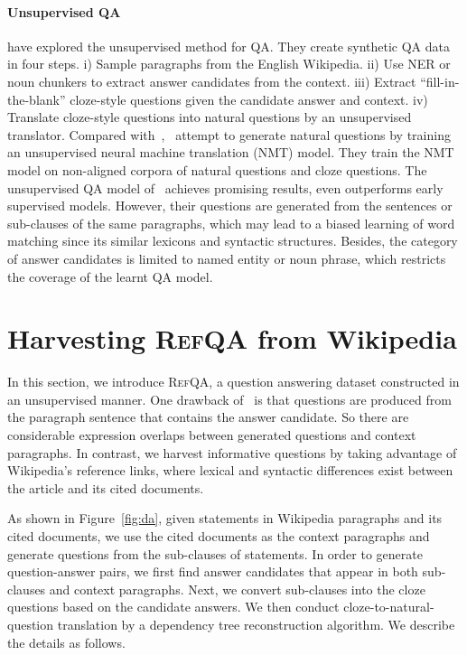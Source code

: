 \documentclass[11pt,a4paper]{article}
\newcommand\refqa{\textsc{RefQA}}
\begin{document}
\paragraph{Unsupervised QA} \citet{lewis2019unsupervisedqa} have explored the unsupervised method for QA. They create synthetic QA data in four steps. i) Sample paragraphs from the English Wikipedia. ii) Use NER or noun chunkers to extract answer candidates from the context. iii) Extract ``fill-in-the-blank'' cloze-style questions given the candidate answer and context. iv) Translate cloze-style questions into natural questions by an unsupervised translator. Compared with~\citet{dhingra2019semi},~\citet{lewis2019unsupervisedqa} attempt to generate natural questions by training an unsupervised neural machine translation (NMT) model. They train the NMT model on non-aligned corpora of natural questions and cloze questions. The unsupervised QA model of~\citet{lewis2019unsupervisedqa} achieves promising results, even outperforms early supervised models.
However, their questions are generated from the sentences or sub-clauses of the same paragraphs, which may lead to a biased learning of word matching since its similar lexicons and syntactic structures. 
Besides, the category of answer candidates is limited to named entity or noun phrase, which restricts the coverage of the learnt QA model. 



\section{Harvesting \refqa{} from Wikipedia}
\label{sec:da}



In this section, we introduce \refqa{}, a question answering dataset constructed in an unsupervised manner.
One drawback of~\citet{lewis2019unsupervisedqa} is that questions are produced from the paragraph sentence that contains the answer candidate. So there are considerable expression overlaps between generated questions and context paragraphs.
In contrast, we harvest informative questions by taking advantage of Wikipedia's reference links, where lexical and syntactic differences exist between the article and its cited documents.



As shown in Figure~\ref{fig:da}, given statements in Wikipedia paragraphs and its cited documents, we use the cited documents as the context paragraphs and generate questions from the sub-clauses of statements.
In order to generate question-answer pairs, we first find answer candidates that appear in both sub-clauses and context paragraphs. 
Next, we convert sub-clauses into the cloze questions based on the candidate answers.
We then conduct cloze-to-natural-question translation by a dependency tree reconstruction algorithm.
We describe the details as follows.
\end{document}
